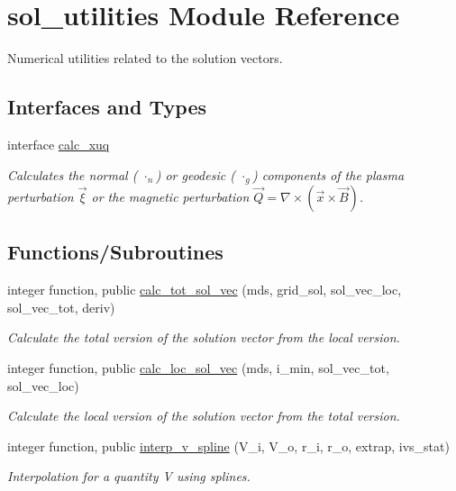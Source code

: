 \hypertarget{namespacesol__utilities}{}\section{sol\+\_\+utilities Module Reference}
\label{namespacesol__utilities}


Numerical utilities related to the solution vectors.  


\subsection*{Interfaces and Types}
\begin{DoxyCompactItemize}
\item 
interface \hyperlink{interfacesol__utilities_1_1calc__xuq}{calc\+\_\+xuq}
\begin{DoxyCompactList}\small\item\em Calculates the normal ( $\cdot_n$) or geodesic ( $\cdot_g$) components of the plasma perturbation $\vec{\xi}$ or the magnetic perturbation $\vec{Q} = \nabla \times \left(\vec{x} \times \vec{B}\right)$. \end{DoxyCompactList}\end{DoxyCompactItemize}
\subsection*{Functions/\+Subroutines}
\begin{DoxyCompactItemize}
\item 
integer function, public \hyperlink{namespacesol__utilities_a8b902a82ae6a238e725da2cf09e7854f}{calc\+\_\+tot\+\_\+sol\+\_\+vec} (mds, grid\+\_\+sol, sol\+\_\+vec\+\_\+loc, sol\+\_\+vec\+\_\+tot, deriv)
\begin{DoxyCompactList}\small\item\em Calculate the total version of the solution vector from the local version. \end{DoxyCompactList}\item 
integer function, public \hyperlink{namespacesol__utilities_a677373f47ee68ad02e9cef5b409bdc26}{calc\+\_\+loc\+\_\+sol\+\_\+vec} (mds, i\+\_\+min, sol\+\_\+vec\+\_\+tot, sol\+\_\+vec\+\_\+loc)
\begin{DoxyCompactList}\small\item\em Calculate the local version of the solution vector from the total version. \end{DoxyCompactList}\item 
integer function, public \hyperlink{namespacesol__utilities_a9af30f5bb948778dcafa7b80af6ea1fa}{interp\+\_\+v\+\_\+spline} (V\+\_\+i, V\+\_\+o, r\+\_\+i, r\+\_\+o, extrap, ivs\+\_\+stat)
\begin{DoxyCompactList}\small\item\em Interpolation for a quantity V using splines. \end{DoxyCompactList}\end{DoxyCompactItemize}
